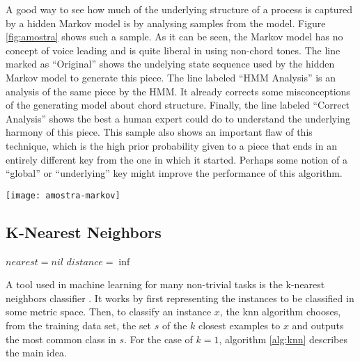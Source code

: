 A good way to see how much of the underlying structure of a process is
captured by a hidden Markov model is by analysing samples from the
model. Figure \ref{fig:amostra} shows such a sample. As it can be
seen, the Markov model has no concept of voice leading and is quite
liberal in using non-chord tones. The line marked as ``Original''
shows the undelying state sequence used by the hidden Markov model to
generate this piece. The line labeled ``HMM Analysis'' is an analysis
of the same piece by the HMM. It already corrects some misconceptions
of the generating model about chord structure. Finally, the line
labeled ``Correct Analysis'' shows the best a human expert could do to
understand the underlying harmony of this piece. This sample also
shows an important flaw of this technique, which is the high prior
probability given to a piece that ends in an entirely different key
from the one in which it started. Perhaps some notion of a ``global''
or ``underlying'' key might improve the performance of this algorithm.

\begin{figure*}[t]
  \centering
  \texttt{[image: amostra-markov]}
  \caption{A sample from the hidden Markov model}
  \label{fig:amostra}
\end{figure*}

\subsection{K-Nearest Neighbors}
\label{sec:knn}

\begin{algorithm}[t]
  \SetLine
  $nearest = nil$\;
  $distance = \inf$\;
  \;
  \caption{A nearest neighbor classifier (a knn for $k=1$).}
  \label{alg:knn}
\end{algorithm}

A tool used in machine learning for many non-trivial tasks is the
k-nearest neighbors classifier \cite{mitchell97:machine}. It works by
first representing the instances to be classified in some metric
space. Then, to classify an instance $x$, the knn algorithm chooses,
from the training data set, the set $s$ of the $k$ closest examples to
$x$ and outputs the most common class in $s$. For the case of $k=1$,
algorithm \ref{alg:knn} describes the main idea.

